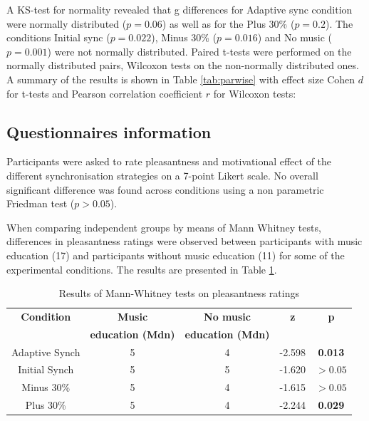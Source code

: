\documentclass[10pt,letterpaper]{article}
\begin{document}
A KS-test for normality revealed that g differences for Adaptive sync condition were normally distributed ($p=0.06$) as well as for the  Plus 30\% ($p=0.2$). The conditions Initial sync ($p=0.022$), Minus 30\% ($p=0.016$) and No music ($p=0.001$) were not normally distributed. 
Paired t-tests were performed on the normally distributed pairs, Wilcoxon tests on the non-normally distributed ones. A summary of the results is shown in Table \ref{tab:parwise} with effect size Cohen $d$ for t-tests and Pearson correlation coefficient $r$ for Wilcoxon tests:




\subsection*{Questionnaires information}

Participants were asked to rate pleasantness and motivational effect of the different synchronisation strategies on a 7-point Likert scale. No overall significant difference was found across conditions using a non parametric Friedman test ($p > 0.05$). 

When comparing independent groups by means of Mann Whitney tests, differences in pleasantness ratings were observed between participants with music education (17) and participants without music education (11) for some of the experimental conditions.
The results are presented in Table \ref{tab:table1}.

\begin{table}[h!]
  \begin{center}
    \caption{Results of Mann-Whitney tests on pleasantness ratings}
    \label{tab:table1}
    \begin{tabular}{|c|c|c|c|c|}
    \hline
      \textbf{Condition} & \textbf{Music} & \textbf{No music} & \textbf{z} & \textbf{p}\\
          & \textbf{education (Mdn)} & \textbf{education (Mdn)} & & \\
         \hline
      Adaptive Synch & 5 & 4 & -2.598 & \textbf{0.013} \\     
      Initial Synch & 5 & 5 & -1.620 & $>0.05$\\     
      Minus 30\% & 5 & 4 & -1.615 & $>0.05$\\     
      Plus 30\% & 5 & 4 & -2.244 & \textbf{0.029} \\   
      \hline
    \end{tabular}
  \end{center}
\end{table}
\end{document}

